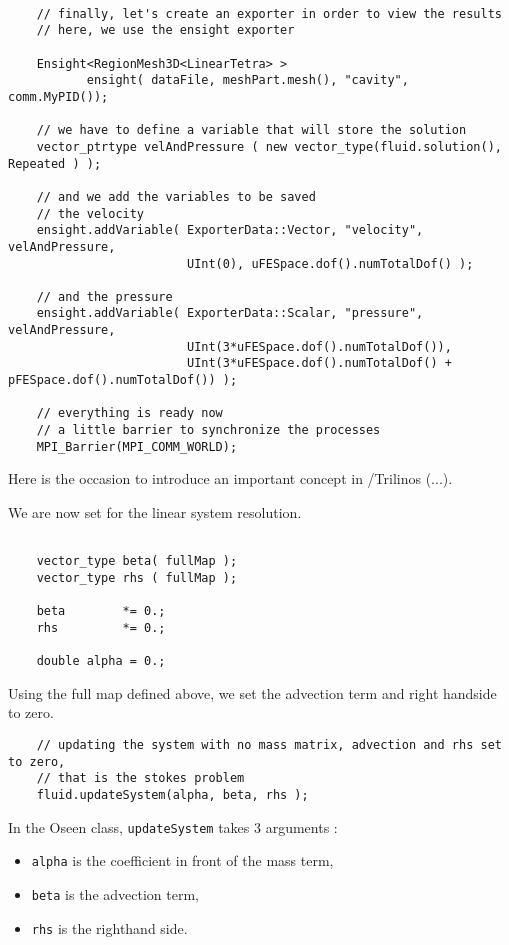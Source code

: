 {\begin{verbatim}

    // finally, let's create an exporter in order to view the results
    // here, we use the ensight exporter

    Ensight<RegionMesh3D<LinearTetra> >
           ensight( dataFile, meshPart.mesh(), "cavity", comm.MyPID());

    // we have to define a variable that will store the solution
    vector_ptrtype velAndPressure ( new vector_type(fluid.solution(), Repeated ) );

    // and we add the variables to be saved
    // the velocity
    ensight.addVariable( ExporterData::Vector, "velocity", velAndPressure,
                         UInt(0), uFESpace.dof().numTotalDof() );

    // and the pressure
    ensight.addVariable( ExporterData::Scalar, "pressure", velAndPressure,
                         UInt(3*uFESpace.dof().numTotalDof()),
                         UInt(3*uFESpace.dof().numTotalDof() + pFESpace.dof().numTotalDof()) );

    // everything is ready now
    // a little barrier to synchronize the processes
    MPI_Barrier(MPI_COMM_WORLD);
\end{verbatim}

Here is the occasion to introduce an important concept in \lifev/Trilinos (...).

We are now set for the linear system resolution.

\begin{verbatim}

    vector_type beta( fullMap );
    vector_type rhs ( fullMap );

    beta        *= 0.;
    rhs         *= 0.;

    double alpha = 0.;
\end{verbatim}

Using the full map defined above, we set the advection term and right handside to zero.


\begin{verbatim}
    // updating the system with no mass matrix, advection and rhs set to zero,
    // that is the stokes problem
    fluid.updateSystem(alpha, beta, rhs );
\end{verbatim}

In the Oseen class, \verb|updateSystem| takes 3 arguments :
\begin{itemize}
\item \verb|alpha| is the coefficient in front of the mass term,
\item \verb|beta| is the advection term,
\item \verb|rhs| is the righthand side.
\end{itemize}

}
